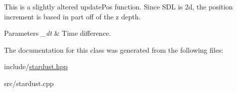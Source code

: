 This is a slightly altered update\-Pos function. Since S\-D\-L is 2d, the position increment is based in part off of the z depth. 


\begin{DoxyParams}{Parameters}
{\em \-\_\-dt} & Time difference. \\
\hline
\end{DoxyParams}


The documentation for this class was generated from the following files\-:\begin{DoxyCompactItemize}
\item 
include/\hyperlink{stardust_8hpp}{stardust.\-hpp}\item 
src/stardust.\-cpp\end{DoxyCompactItemize}
